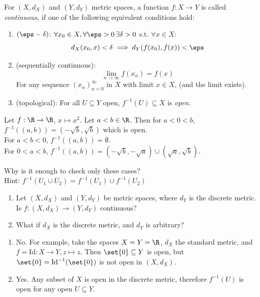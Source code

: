 \begin{definition*}
For $(X, d_X)$ and $(Y, d_Y)$ metric spaces, a function $f: X \to Y$ is called \emph{continuous}, if one of the following equivalent conditions hold:

\begin{enumerate}
    \item $(\eps-\delta)$: $\forall x_0 \in X, \forall \eps > 0 \, \exists \delta > 0$ s.t. $\forall x \in X$:
    \[ d_X(x_0, x) < \delta \implies d_Y(f(x_0), f(x)) < \eps \]
    
    \item (sequentially continuous):
    \[ \lim_{n \to \infty} f(x_n) = f(x) \]
    For any sequence $(x_n)_{n=0}^\infty$ in $X$ with limit $x \in X$, (and the limit exists).
    
    \item (topological): For all $U \subseteq Y$ open, $f^{-1}(U) \subseteq X$ is \emph{open}.
\end{enumerate}
\end{definition*}

\begin{example*}
Let $f: \R \to \R$, $x \mapsto x^2$. Let $a < b \in \R$.
Then for $a < 0 < b$, $f^{-1}((a,b)) = (-\sqrt{b}, \sqrt{b})$ which is open. \\
For $a < b < 0$, $f^{-1}((a,b)) = \emptyset$. \\
For $0 < a < b$, $f^{-1}((a,b)) = (-\sqrt{b}, -\sqrt{a}) \cup (\sqrt{a}, \sqrt{b})$.

\textcolor{eDarkCyan}{Why is it enough to check only these cases?} \\
\textcolor{eGray}{Hint: $f^{-1}(U_1 \cup U_2) = f^{-1}(U_1) \cup f^{-1}(U_2)$}
\end{example*}

\vspace{0.5cm}

\begin{question}
\begin{enumerate}[start=2] %
    \item Let $(X, d_X)$ and $(Y, d_Y)$ be metric spaces, where $d_Y$ is the discrete metric. Is $f: (X, d_X) \to (Y, d_Y)$ continuous?
    \item What if $d_X$ is the discrete metric, and $d_Y$ is arbitrary?
\end{enumerate}
\end{question}

\begin{answer}
\begin{enumerate}[start=2]
    \item \textcolor{eDarkRed}{No.} For example, take the spaces $X = Y = \R$, $d_X$ the standard metric, and $f = \text{Id}: X \to Y, z \mapsto z$. Then $\set{0} \subseteq Y$ is open, but $\set{0} = \text{Id}^{-1}(\set{0})$ is not open in $(X, d_X)$.
    \item \textcolor{eDarkGreen}{Yes.} Any subset of $X$ is open in the discrete metric, therefore $f^{-1}(U)$ is open for any open $U \subseteq Y$.
\end{enumerate}
\end{answer}

